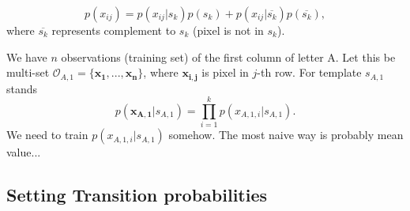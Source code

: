 \documentclass[a4paper,12pt]{article}
\newcounter{ohNoteCounter}
\newcommand{\ohnote}[1]{{\scriptsize  \color{Cgreen} $\clubsuit$~\refstepcounter{ohNoteCounter}\textsf{[OH]$_{\arabic{ohNoteCounter}}$:{#1}}}}
\renewcommand{\ohnote}[1]{}
\begin{document}
  \[
   p(x_{ij}) = p(x_{ij} | s_k) p(s_k) + p(x_{ij}|\overline{s_k}) p(\overline{s_k}),
  \]
  where $\overline{s_k}$ represents complement to $s_k$ (pixel is not in $s_k$).

  \ohnote{I don't know about this, what about another approach. I am stuck here actually. :-(
  I describe this on example, if we agree on this I rewrite it in general form. }

  We have $n$ observations (training set) of the first column of letter A. Let this be multi-set $\mathcal{O}_{A,1} = \{\mathbf{x_1},...,\mathbf{x_n}\}$, where $\mathbf{x_{i,j}}$ is pixel in $j$-th row. For template $s_{A,1}$ stands
  \[
    p(\mathbf{x_{A,1}}|s_{A,1}) = \prod_{i=1}^{k} p(x_{A,1,i}|s_{A,1}).
  \]
  We need to train $p(x_{A,1,i}|s_{A,1})$ somehow. The most naive way is probably mean value...
  


  \subsection{Setting Transition probabilities}
\end{document}
